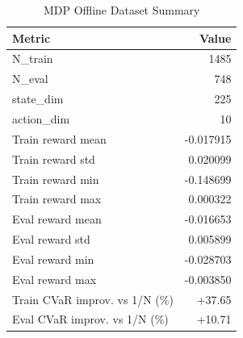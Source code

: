 \begin{table}[htbp]
  \centering
  \caption{MDP Offline Dataset Summary}
  \label{tab:mdp_summary}
  \begin{tabular}{lr}
    \toprule
    \textbf{Metric} & \textbf{Value} \\
    \midrule
    N\_train & 1485 \\
    N\_eval & 748 \\
    state\_dim & 225 \\
    action\_dim & 10 \\
    Train reward mean & -0.017915 \\
    Train reward std & 0.020099 \\
    Train reward min & -0.148699 \\
    Train reward max & 0.000322 \\
    Eval reward mean & -0.016653 \\
    Eval reward std & 0.005899 \\
    Eval reward min & -0.028703 \\
    Eval reward max & -0.003850 \\
    Train CVaR improv. vs 1/N (\%) & +37.65 \\
    Eval CVaR improv. vs 1/N (\%) & +10.71 \\
    \bottomrule
  \end{tabular}
\end{table}
